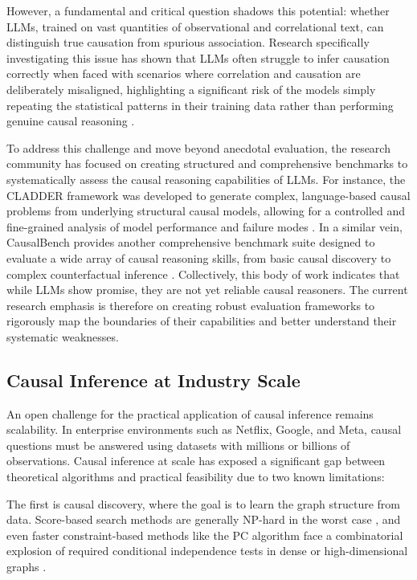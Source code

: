 {However, a fundamental and critical question shadows this potential: whether LLMs, trained on vast quantities of observational and correlational text, can distinguish true causation from spurious association. Research specifically investigating this issue has shown that LLMs often struggle to infer causation correctly when faced with scenarios where correlation and causation are deliberately misaligned, highlighting a significant risk of the models simply repeating the statistical patterns in their training data rather than performing genuine causal reasoning \cite{jin2023can}.

To address this challenge and move beyond anecdotal evaluation, the research community has focused on creating structured and comprehensive benchmarks to systematically assess the causal reasoning capabilities of LLMs. For instance, the CLADDER framework was developed to generate complex, language-based causal problems from underlying structural causal models, allowing for a controlled and fine-grained analysis of model performance and failure modes \cite{jin2023cladder}. In a similar vein, CausalBench provides another comprehensive benchmark suite designed to evaluate a wide array of causal reasoning skills, from basic causal discovery to complex counterfactual inference \cite{wang2024causalbench}. Collectively, this body of work indicates that while LLMs show promise, they are not yet reliable causal reasoners. The current research emphasis is therefore on creating robust evaluation frameworks to rigorously map the boundaries of their capabilities and better understand their systematic weaknesses.

\subsection{Causal Inference at Industry Scale}

An open challenge for the practical application of causal inference remains scalability. In enterprise environments such as Netflix, Google, and Meta, causal questions must be answered using datasets with millions or billions of observations. Causal inference at scale has exposed a significant gap between theoretical algorithms and practical feasibility due to two known limitations:

 The first is causal discovery, where the goal is to learn the graph structure from data. Score-based search methods are generally NP-hard in the worst case \cite{Chickering2002Optimal}, and even faster constraint-based methods like the PC algorithm face a combinatorial explosion of required conditional independence tests in dense or high-dimensional graphs \cite{Kalisch2007Estimating}.
 
}
